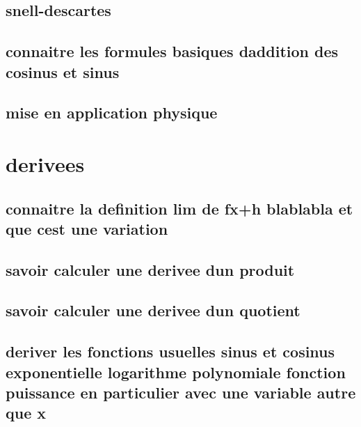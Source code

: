 \documentclass[11pt]{article}
\begin{document}
    \subsection{snell-descartes}
      
    \subsection{connaitre les formules basiques daddition des cosinus et sinus}
      
      
    \subsection{mise en application   physique}
      
  \section{derivees}
    \subsection{connaitre la definition lim de fx+h blablabla et que cest une variation}
      
    \subsection{savoir calculer une derivee dun produit}
      
    \subsection{savoir calculer une derivee dun quotient}
      
    \subsection{deriver les fonctions usuelles   sinus et cosinus  exponentielle  logarithme  polynomiale  fonction puissance  en particulier avec une variable autre que x}
      
\end{document}
